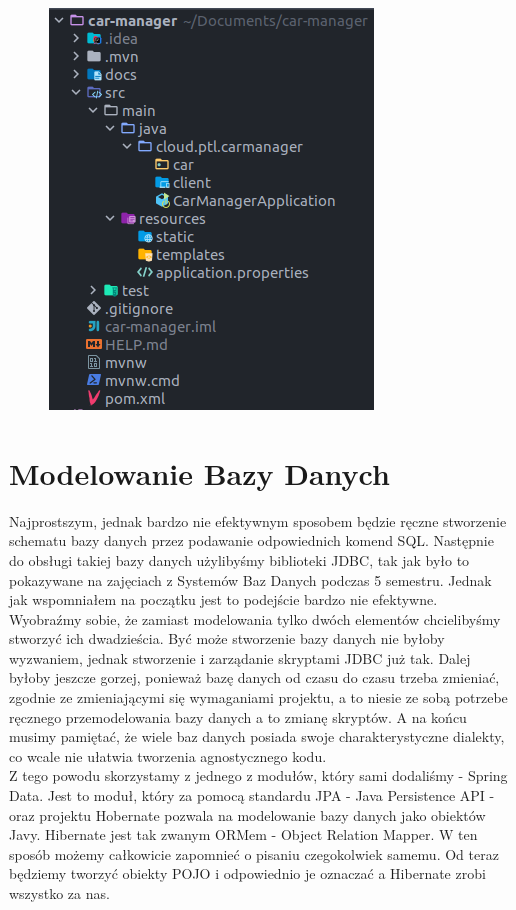 \documentclass{article}
\begin{document}
        \begin{figure}[h]
            \centering
            \includegraphics{tree.png}
        \end{figure}
    
    \section{Modelowanie Bazy Danych}
        Najprostszym, jednak bardzo nie efektywnym sposobem będzie ręczne stworzenie schematu bazy danych przez podawanie odpowiednich komend SQL. Następnie do obsługi takiej bazy danych użylibyśmy biblioteki JDBC, tak jak było to pokazywane na zajęciach z Systemów Baz Danych podczas 5 semestru. Jednak jak wspomniałem na początku jest to podejście bardzo nie efektywne. Wyobraźmy sobie, że zamiast modelowania tylko dwóch elementów chcielibyśmy stworzyć ich dwadzieścia. Być może stworzenie bazy danych nie byłoby wyzwaniem, jednak stworzenie i zarządanie skryptami JDBC już tak. Dalej byłoby jeszcze gorzej, ponieważ bazę danych od czasu do czasu trzeba zmieniać, zgodnie ze zmieniającymi się wymaganiami projektu, a to niesie ze sobą potrzebe ręcznego przemodelowania bazy danych a to zmianę skryptów. A na końcu musimy pamiętać, że wiele baz danych posiada swoje charakterystyczne dialekty, co wcale nie ułatwia tworzenia agnostycznego kodu. \\
        Z tego powodu skorzystamy z jednego z modułów, który sami dodaliśmy - Spring Data. Jest to moduł, który za pomocą standardu JPA - Java Persistence API - oraz projektu Hobernate pozwala na modelowanie bazy danych jako obiektów Javy. Hibernate jest tak zwanym ORMem - Object Relation Mapper. W ten sposób możemy całkowicie zapomnieć o pisaniu czegokolwiek samemu. Od teraz będziemy tworzyć obiekty POJO i odpowiednio je oznaczać a Hibernate zrobi wszystko za nas.
        
\end{document}
